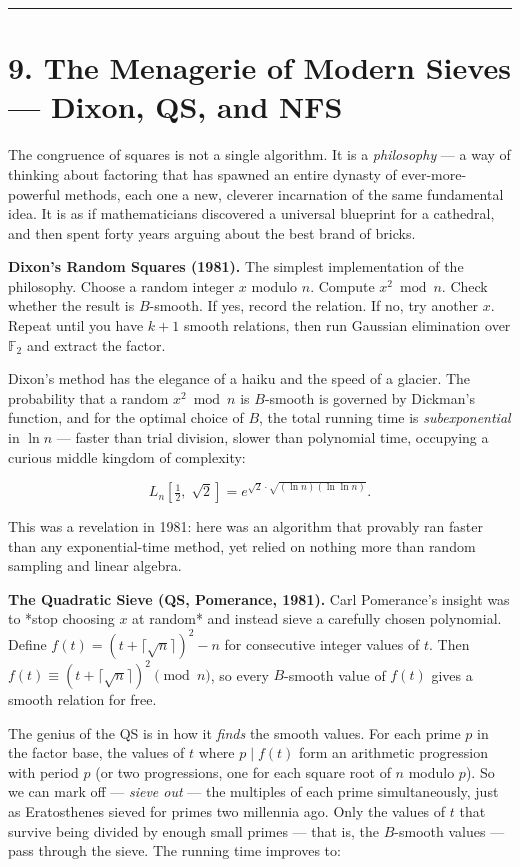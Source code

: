 \documentclass[11pt,openany]{book}
\theoremstyle{definition}
\theoremstyle{plain}
\theoremstyle{remark}
\begin{document}
\bigskip\noindent\rule{\textwidth}{0.4pt}\bigskip


\section{9. The Menagerie of Modern Sieves — Dixon, QS, and NFS}


The congruence of squares is not a single algorithm. It is a \textit{philosophy} — a way of thinking about factoring that has spawned an entire dynasty of ever-more-powerful methods, each one a new, cleverer incarnation of the same fundamental idea. It is as if mathematicians discovered a universal blueprint for a cathedral, and then spent forty years arguing about the best brand of bricks.

\textbf{Dixon's Random Squares (1981).} The simplest implementation of the philosophy. Choose a random integer $x$ modulo $n$. Compute $x^2 \bmod n$. Check whether the result is $B$-smooth. If yes, record the relation. If no, try another $x$. Repeat until you have $k + 1$ smooth relations, then run Gaussian elimination over $\mathbb{F}_2$ and extract the factor.

Dixon's method has the elegance of a haiku and the speed of a glacier. The probability that a random $x^2 \bmod n$ is $B$-smooth is governed by Dickman's function, and for the optimal choice of $B$, the total running time is \textit{subexponential} in $\ln n$ — faster than trial division, slower than polynomial time, occupying a curious middle kingdom of complexity:

$$L_n\!\left[\tfrac{1}{2}, \; \sqrt{2}\right] = e^{\sqrt{2} \cdot \sqrt{(\ln n)(\ln \ln n)}}.$$

This was a revelation in 1981: here was an algorithm that provably ran faster than any exponential-time method, yet relied on nothing more than random sampling and linear algebra.

\textbf{The Quadratic Sieve (QS, Pomerance, 1981).} Carl Pomerance's insight was to *stop choosing $x$ at random* and instead sieve a carefully chosen polynomial. Define $f(t) = (t + \lceil \sqrt{n} \rceil)^2 - n$ for consecutive integer values of $t$. Then $f(t) \equiv (t + \lceil \sqrt{n} \rceil)^2 \pmod{n}$, so every $B$-smooth value of $f(t)$ gives a smooth relation for free.

The genius of the QS is in how it \textit{finds} the smooth values. For each prime $p$ in the factor base, the values of $t$ where $p \mid f(t)$ form an arithmetic progression with period $p$ (or two progressions, one for each square root of $n$ modulo $p$). So we can mark off — \textit{sieve out} — the multiples of each prime simultaneously, just as Eratosthenes sieved for primes two millennia ago. Only the values of $t$ that survive being divided by enough small primes — that is, the $B$-smooth values — pass through the sieve. The running time improves to:
\end{document}
